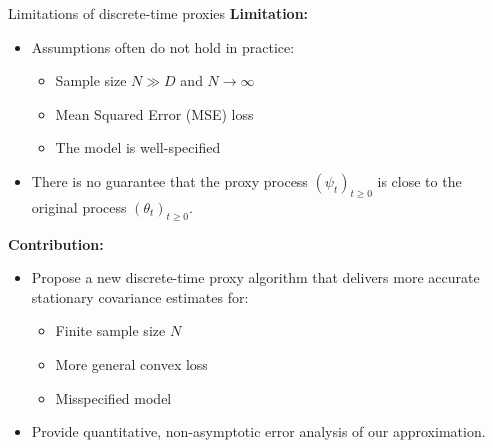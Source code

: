 \documentclass[10pt,xcolor=table]{beamer}
\begin{document}
\begin{frame}{Limitations of discrete-time proxies}
	\textbf{Limitation: }
	\begin{itemize}
		\item Assumptions often do not hold in practice:
		\begin{itemize}
			\item Sample size $N \gg D$ and $N \to \infty$
			\item Mean Squared Error (MSE) loss
			\item The model is well-specified
		\end{itemize}
		\item There is no guarantee that the proxy process $(\psi_{t})_{t \ge 0}$ is close 
		to the original process $(\theta_{t})_{t \ge 0}$.
	\end{itemize} \pause
	
	\textbf{Contribution: }
	\begin{itemize}
	\item Propose a new discrete-time proxy algorithm that delivers more accurate stationary covariance estimates for: 
	\begin{itemize}
		\item Finite sample size $N$
		\item More general convex loss
		\item Misspecified model
	\end{itemize}
	\item Provide quantitative, non-asymptotic error analysis of our approximation.
\end{itemize}
\end{frame}

\end{document}

